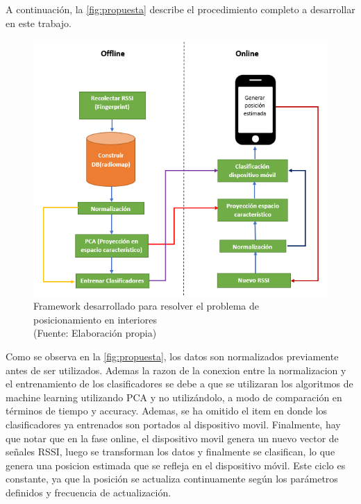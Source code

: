 A continuación, la \autoref{fig:propuesta} describe el procedimiento completo a desarrollar en este trabajo.


\begin{figure}[ht!]
\centering
\includegraphics[width=.6\textwidth]{figures/propuesta_memoria.png}
\caption[abs]{Framework desarrollado para resolver el problema de posicionamiento en interiores\\
{\scriptsize (Fuente: Elaboración propia)}}
\label{fig:propuesta}
\end{figure}

Como se observa en la \autoref{fig:propuesta}, los datos son normalizados previamente antes de ser utilizados. Ademas la razon de la conexion entre la normalizacion y el entrenamiento de los clasificadores se debe a que se utilizaran los algoritmos de machine learning utilizando PCA y no utilizándolo, a modo de comparación en términos de tiempo y accuracy. Ademas, se ha omitido el item en donde los clasificadores ya entrenados son portados al dispositivo movil. Finalmente, hay que notar que en la fase online, el dispositivo movil genera un nuevo vector de señales RSSI, luego se transforman los datos y finalmente se clasifican, lo que genera una posicion estimada que se refleja en el dispositivo móvil. Este ciclo es constante, ya que la posición se actualiza continuamente según los parámetros definidos y frecuencia de actualización.